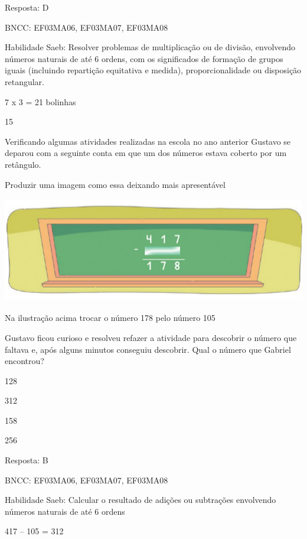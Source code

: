 
Resposta: D

BNCC: EF03MA06, EF03MA07, EF03MA08

Habilidade Saeb: Resolver problemas de multiplicação ou de divisão,
envolvendo números naturais de até 6 ordens, com os significados de
formação de grupos iguais (incluindo repartição equitativa e medida),
proporcionalidade ou disposição retangular.

7 x 3 = 21 bolinhas

\num{15}

Verificando algumas atividades realizadas na escola no ano anterior
Gustavo se deparou com a seguinte conta em que um dos números estava
coberto por um retângulo.

Produzir uma imagem como essa deixando mais apresentável

\includegraphics[width=5.39213in,height=1.80849in]{media/image141.png}

Na ilustração acima trocar o número 178 pelo número 105

Gustavo ficou curioso e resolveu refazer a atividade para descobrir o
número que faltava e, após alguns minutos conseguiu descobrir. Qual o
número que Gabriel encontrou?

\begin{escolha}

\item
  128
\item
  312
\item
  158
\item
  256
\end{escolha}

Resposta: B

BNCC: EF03MA06, EF03MA07, EF03MA08

Habilidade Saeb: Calcular o resultado de adições ou subtrações
envolvendo números naturais de até 6 ordens

417 -- 105 = 312
